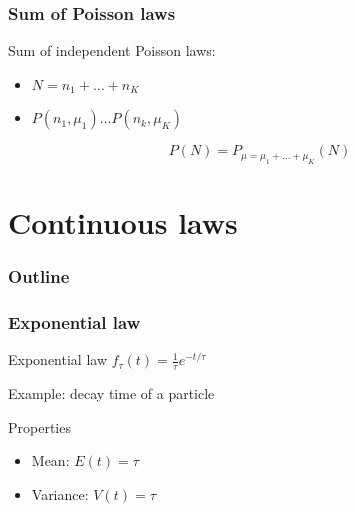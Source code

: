 \documentclass[9pt]{beamer}
\newif\ifmynote
\newcommand\mynote[1]{%
\ifmynote \textbf{#1} \else \fi
}
\begin{document}
\begin{frame}
 \frametitle{Sum of Poisson laws}
 
 \mynote{Écrire au tableau}
 
 Sum of independent Poisson laws:
 
 \begin{itemize}
  \item $N = n_1 + \dots + n_K$
  \item $P(n_1,\mu_1) \dots P(n_k,\mu_K)$
 \end{itemize}
 
 $$P(N) = P_{\mu = \mu_1 + \dots + \mu_K}(N)$$
 

\end{frame}

\section{Continuous laws}

\begin{frame}
 \frametitle{Outline}
 
 \tableofcontents[current]
\end{frame}

\begin{frame}
 \frametitle{Exponential law}
 
 \mynote{Écrire au tableau}
 
 \begin{block}{Exponential law}
  $f_\tau (t) = \frac{1}{\tau} e^{-t/\tau}$
 \end{block}
 
 Example: decay time of a particle
 
 \begin{block}{Properties}
  \begin{itemize}
   \item Mean: $E(t) = \tau$
   \item Variance: $V(t) = \tau$
  \end{itemize}

 \end{block}


\end{frame}
\end{document}
